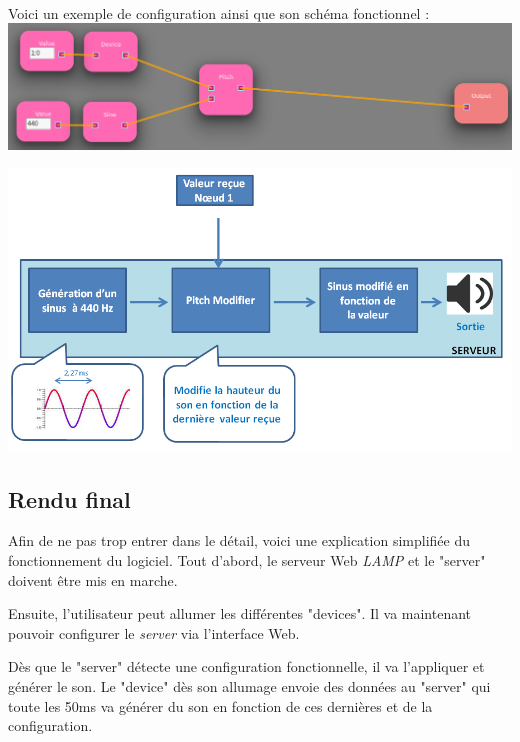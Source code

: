 \documentclass[12pt]{article}
\begin{document}
	\paragraph{}
	Voici un exemple de configuration ainsi que son schéma fonctionnel :\\
	
	\vspace{1cm}
	\noindent
	\includegraphics[width=\textwidth]{config_sheme}
	
	\vspace{1cm}
	\noindent
	\includegraphics[width=\textwidth]{config_example}
	\vspace{1cm}
	
	\subsection{Rendu final}
	Afin de ne pas trop entrer dans le détail, voici une explication simplifiée du fonctionnement du logiciel. Tout d'abord,  le serveur Web \textit{LAMP} et le "server" doivent être mis en marche. 
	
	Ensuite, l'utilisateur peut allumer les différentes "devices". Il va maintenant pouvoir configurer le \textit{server} via l'interface Web.
	
	Dès que le "server" détecte une configuration fonctionnelle, il va l'appliquer et générer le son. Le "device" dès son allumage envoie des données au "server" qui toute les 50ms va générer du son en fonction de ces dernières et de la configuration.
	
\end{document}

